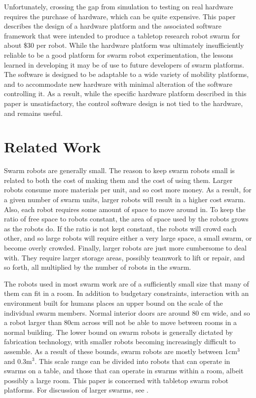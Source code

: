 \documentclass[]{article}
\begin{document}
Unfortunately, crossing the gap from simulation to testing on real hardware requires the purchase of hardware, which can be quite expensive. 
This paper describes the design of a hardware platform and the associated software framework that were intended to produce a tabletop research robot swarm for about \$30 per robot. 
While the hardware platform was ultimately insufficiently reliable to be a good platform for swarm robot experimentation, the lessons learned in developing it may be of use to future developers of swarm platforms. 
The software is designed to be adaptable to a wide variety of mobility platforms, and to accommodate new hardware with minimal alteration of the software controlling it. 
As a result, while the specific hardware platform described in this paper is unsatisfactory, the control software design is not tied to the hardware, and remains useful. 

\section{Related Work}

Swarm robots are generally small. 
The reason to keep swarm robots small is related to both the cost of making them and the cost of using them. 
Larger robots consume more materials per unit, and so cost more money.
As a result, for a given number of swarm units, larger robots will result in a higher cost swarm. 
Also, each robot requires some amount of space to move around in. 
To keep the ratio of free space to robots constant, the area of space used by the robots grows as the robots do. 
If the ratio is not kept constant, the robots will crowd each other, and so large robots will require either a very large space, a small swarm, or become overly crowded.
Finally, larger robots are just more cumbersome to deal with. 
They require larger storage areas, possibly teamwork to lift or repair, and so forth, all multiplied by the number of robots in the swarm. 

The robots used in most swarm work are of a sufficiently small size that many of them can fit in a room. In addition to budgetary constraints, interaction with an environment built for humans places an upper bound on the scale of the individual swarm members. 
Normal interior doors are around 80 cm wide, and so a robot larger than 80cm across will not be able to move between rooms in a normal building.
The lower bound on swarm robots is generally dictated by fabrication technology, with smaller robots becoming increasingly difficult to assemble. 
As a result of these bounds, swarm robots are mostly between 1cm$^3$ and 0.3m$^3$. 
This scale range can be divided into robots that can operate in swarms on a table, and those that can operate in swarms within a room, albeit possibly a large room. 
This paper is concerned with tabletop swarm robot platforms.
For discussion of larger swarms, see \cite{olson2013cacm, dorigo2013swarmanoid, bonani2010marxbot, tammet2008rfid, guo2007bio}. 
\end{document}
